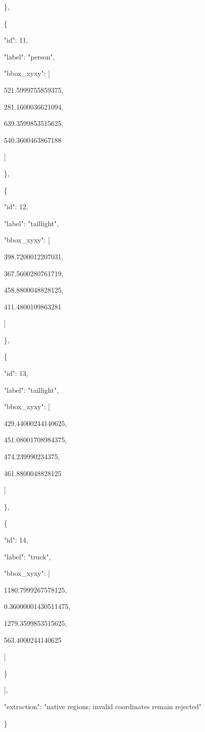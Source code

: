 \documentclass[10pt,a4paper]{article}
\begin{document}
    \},\allowbreak{}\par
    \{\par
      "id":\allowbreak{} 11,\allowbreak{}\par
      "label":\allowbreak{} "person",\allowbreak{}\par
      "bbox\_xyxy":\allowbreak{} [\par
        521.5999755859375,\allowbreak{}\par
        281.1600036621094,\allowbreak{}\par
        639.3599853515625,\allowbreak{}\par
        540.3600463867188\par
      ]\par
    \},\allowbreak{}\par
    \{\par
      "id":\allowbreak{} 12,\allowbreak{}\par
      "label":\allowbreak{} "taillight",\allowbreak{}\par
      "bbox\_xyxy":\allowbreak{} [\par
        398.7200012207031,\allowbreak{}\par
        367.5600280761719,\allowbreak{}\par
        458.8800048828125,\allowbreak{}\par
        411.4800109863281\par
      ]\par
    \},\allowbreak{}\par
    \{\par
      "id":\allowbreak{} 13,\allowbreak{}\par
      "label":\allowbreak{} "taillight",\allowbreak{}\par
      "bbox\_xyxy":\allowbreak{} [\par
        429.44000244140625,\allowbreak{}\par
        451.08001708984375,\allowbreak{}\par
        474.239990234375,\allowbreak{}\par
        461.8800048828125\par
      ]\par
    \},\allowbreak{}\par
    \{\par
      "id":\allowbreak{} 14,\allowbreak{}\par
      "label":\allowbreak{} "truck",\allowbreak{}\par
      "bbox\_xyxy":\allowbreak{} [\par
        1180.7999267578125,\allowbreak{}\par
        0.36000001430511475,\allowbreak{}\par
        1279.3599853515625,\allowbreak{}\par
        563.4000244140625\par
      ]\par
    \}\par
  ],\allowbreak{}\par
  "extraction":\allowbreak{} "native regions; invalid coordinates remain rejected"\par
\}
\end{document}
